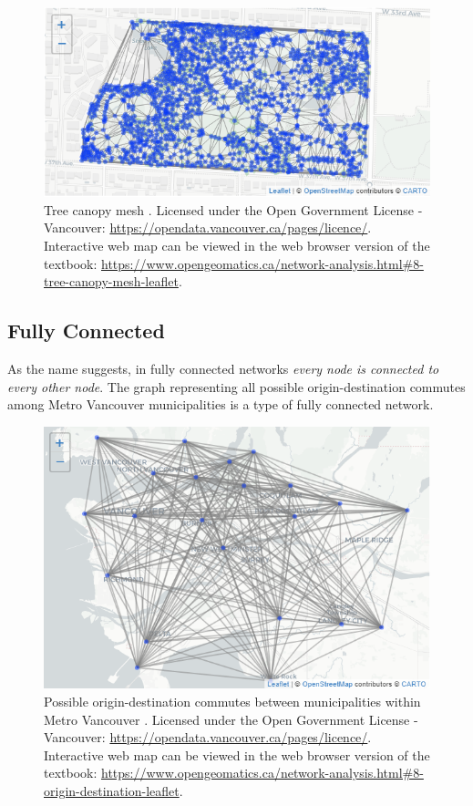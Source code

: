 \documentclass[
]{book}
\begin{document}
\begin{figure}
\includegraphics[width=8.57in]{images/08-Tree-canopy-mesh-static} \caption{Tree canopy mesh \citep{city_of_vancouver_open_nodate}. Licensed under the Open Government License - Vancouver: \url{https://opendata.vancouver.ca/pages/licence/}. Interactive web map can be viewed in the web browser version of the textbook: \url{https://www.opengeomatics.ca/network-analysis.html\#8-tree-canopy-mesh-leaflet}.}\label{fig:8-tree-canopy-mesh-leaflet}
\end{figure}

\subsection{Fully Connected}\label{fully-connected}

As the name suggests, in fully connected networks \emph{every node is connected to every other node}. The graph representing all possible origin-destination commutes among Metro Vancouver municipalities is a type of fully connected network.



\begin{figure}
\includegraphics[width=8.56in]{images/08-Possible-origin-destination-commutes-between-municipalities-within-Metro-Vancouver-static} \caption{Possible origin-destination commutes between municipalities within Metro Vancouver \citep{city_of_vancouver_open_nodate}. Licensed under the Open Government License - Vancouver: \url{https://opendata.vancouver.ca/pages/licence/}. Interactive web map can be viewed in the web browser version of the textbook: \url{https://www.opengeomatics.ca/network-analysis.html\#8-origin-destination-leaflet}.}\label{fig:8-origin-destination-leaflet}
\end{figure}
\end{document}
